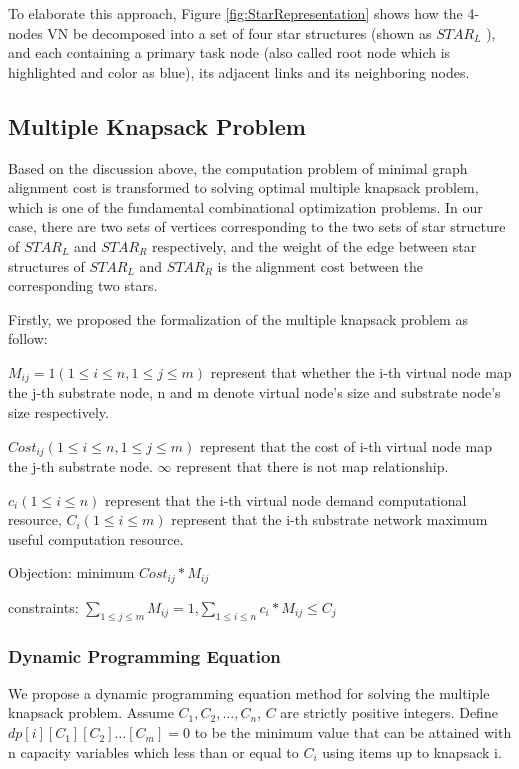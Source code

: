 To elaborate this approach, Figure \ref{fig:StarRepresentation} shows how the 4-nodes VN be decomposed into a set of four star structures (shown as $STAR_L$ ), and each containing a primary task node (also called root node which is highlighted and color as blue), its adjacent links and its neighboring nodes.

\subsection{Multiple Knapsack Problem}
Based on the discussion above, the computation problem of minimal graph alignment cost is transformed to solving optimal multiple knapsack problem, which is one of the fundamental combinational optimization problems. In our case, there are two sets of vertices corresponding to the two sets of star structure of $STAR_L$ and $STAR_R$ respectively, and the weight of the edge between star structures of $STAR_L$ and $STAR_R$ is the alignment cost between the corresponding two stars.

Firstly, we proposed the formalization of the multiple knapsack problem as follow:

$M_{ij}=1(1\leq i\leq n,1 \leq j \leq m)$ represent that whether the i-th virtual node map the j-th substrate node, n and m denote virtual node's size and substrate node's size respectively.

$Cost_{ij}(1\leq i\leq n,1 \leq j \leq m)$ represent that the cost of i-th virtual node map the j-th substrate node. $\infty$ represent that there is not map relationship.

$c_i(1\leq i\leq n)$ represent that the i-th virtual node demand computational resource, $C_i(1\leq i\leq m)$ represent that the i-th substrate network maximum useful computation resource.

Objection: minimum $Cost_{ij}*M_{ij}$

constraints: $\sum\limits_{1\leq j\leq m} M_{ij}=1$,$\sum\limits_{1\leq i\leq n} c_i*M_{ij}\leq C_j$

\subsubsection{Dynamic Programming Equation}
\label{lab:DynamicProgrammingEquation}
We propose a dynamic programming equation method for solving the multiple knapsack problem. Assume $C_1,C_2,\ldots,C_n$, $C$ are strictly positive integers. Define $dp[i][{C_1}][{C_2}] \ldots [{C_m}]=0$ to be the minimum value that can be attained with n capacity variables  which less than or equal to $C_i$ using items up to knapsack i.

